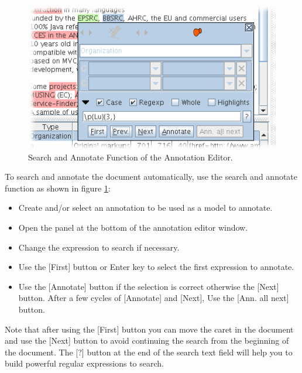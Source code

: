 \begin{figure}[htb]
\begin{center}
\includegraphics[scale=0.5]{annotation-editor-replace.png}
\end{center}
\caption{Search and Annotate Function of the Annotation Editor.}
\label{fig:searchAnnotateAnnotationEditor}
\end{figure}

To search and annotate the document automatically, use the search and
annotate function as shown in figure
\ref{fig:searchAnnotateAnnotationEditor}:

\begin{itemize}
\item Create and/or select an annotation to be used as a model to annotate.

\item Open the panel at the bottom of the annotation editor window.

\item Change the expression to search if necessary.

\item Use the [First] button or Enter key to select the first expression to
annotate.

\item Use the [Annotate] button if the selection is correct otherwise the
[Next] button. After a few cycles of [Annotate] and [Next], Use the [Ann. all
next] button.
\end{itemize}

Note that after using the [First] button you can move the caret in the
document and use the [Next] button to avoid continuing the search from the
beginning of the document. The [?] button at the end of the search text
field will help you to build powerful regular expressions to search.


